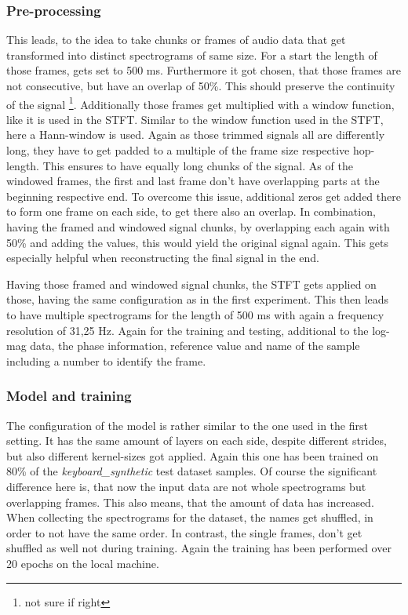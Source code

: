 \subsubsection{Pre-processing}
This leads, to the idea to take chunks or frames of audio data that get transformed into distinct spectrograms of same size. For a start the length of those frames, gets set to 500 ms. Furthermore it got chosen, that those frames are not consecutive, but have an overlap of 50\%. This should preserve the continuity of the signal \footnote{not sure if right}. Additionally those frames get multiplied with a window function, like it is used in the STFT. Similar to the window function used in the STFT, here a Hann-window is used.  Again as those trimmed signals all are differently long, they have to get padded to a multiple of the frame size respective hop-length. This ensures to have equally long chunks of the signal. As of the windowed frames, the first and last frame don't have overlapping parts at the beginning respective end. To overcome this issue, additional zeros get added there to form one frame on each side, to get there also an overlap. In combination, having the framed and windowed signal chunks, by overlapping each again with 50\% and adding the values, this would yield the original signal again. This gets especially helpful when reconstructing the final signal in the end. 

Having those framed and windowed signal chunks, the STFT gets applied on those, having the same configuration as in the first experiment. This then leads to have multiple spectrograms for the length of 500 ms with again a frequency resolution of 31,25 Hz. Again for the training and testing, additional to the log-mag data, the phase information, reference value and name of the sample including a number to identify the frame.

\subsubsection{Model and training}
The configuration of the model is rather similar to the one used in the first setting. It has the same amount of layers on each side, despite different strides, but also different kernel-sizes got applied. Again this one has been trained on 80\% of the \textit{keyboard\_synthetic} test dataset samples. Of course the significant difference here is, that now the input data are not whole spectrograms but overlapping frames. This also means, that the amount of data has increased. When collecting the spectrograms for the dataset, the names get shuffled, in order to not have the same order. In contrast, the single frames, don't get shuffled as well not during training. Again the training has been performed over 20 epochs on the local machine.

